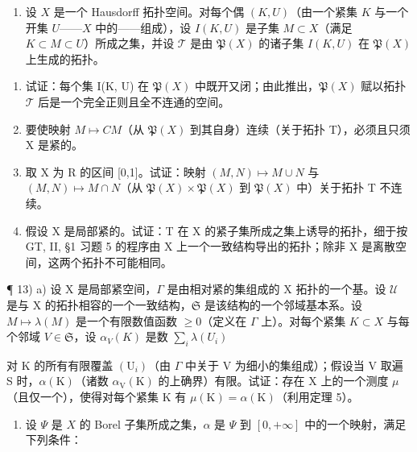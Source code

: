 \begin{enumerate}
\def\labelenumi{\arabic{enumi})}
\setcounter{enumi}{11}
\tightlist
\item
  设 \(X\) 是一个 Hausdorff 拓扑空间。对每个偶 \((K, U)\)（由一个紧集 \(K\) 与一个开集 \(U\)——\(X\) 中的——组成），设 \(I(K, U)\) 是子集 \(M \subset X\)（满足 \(K \subset M \subset U\)）所成之集，并设 \(\mathcal{T}\) 是由 \(\mathfrak{P}(X)\) 的诸子集 \(I(K, U)\) 在 \(\mathfrak{P}(X)\) 上生成的拓扑。
\end{enumerate}

\begin{enumerate}
\def\labelenumi{\alph{enumi})}
\item
  试证：每个集 I(K, U) 在 \(\mathfrak{P}(X)\) 中既开又闭；由此推出，\(\mathfrak{P}(X)\) 赋以拓扑 \(\mathcal{T}\) 后是一个完全正则且全不连通的空间。
\item
  要使映射 \(M \mapsto CM\)（从 \(\mathfrak{P}(X)\) 到其自身）连续（关于拓扑 T），必须且只须 X 是紧的。
\item
  取 X 为 R 的区间 {[}0,1{]}。试证：映射 \((M,N)\mapsto M\cup N\) 与 \((M,N)\mapsto M\cap N\)（从 \(\mathfrak{P}(X)\times\mathfrak{P}(X)\) 到 \(\mathfrak{P}(X)\) 中）关于拓扑 T 不连续。
\item
  假设 X 是局部紧的。试证：T 在 X 的紧子集所成之集上诱导的拓扑，细于按 GT, II, §1 习题 5 的程序由 X 上一个一致结构导出的拓扑；除非 X 是离散空间，这两个拓扑不可能相同。
\end{enumerate}

¶ 13) a) 设 X 是局部紧空间，\(\Gamma\) 是由相对紧的集组成的 X 拓扑的一个基。设 \(\mathcal{U}\) 是与 X 的拓扑相容的一个一致结构，\(\mathfrak{S}\) 是该结构的一个邻域基本系。设 \(M \mapsto \lambda(M)\) 是一个有限数值函数 \(\geqslant 0\)（定义在 \(\Gamma\) 上）。对每个紧集 \(K \subset X\) 与每个邻域 \(V \in \mathfrak{S}\)，设 \(\alpha_V(K)\) 是数 \(\sum_{i} \lambda(U_i)\)

对 K 的所有有限覆盖 \((\mathrm{U}_{i})\)（由 \(\Gamma\) 中关于 V 为细小的集组成）；假设当 V 取遍 S 时，\(\alpha(\mathrm{K})\)（诸数 \(\alpha_{\mathrm{V}}(\mathrm{K})\) 的上确界）有限。试证：存在 X 上的一个测度 \(\mu\)（且仅一个），使得对每个紧集 K 有 \(\mu(\mathrm{K}) = \alpha(\mathrm{K})\)（利用定理 5）。

\begin{enumerate}
\def\labelenumi{\alph{enumi})}
\setcounter{enumi}{1}
\tightlist
\item
  设 \(\Psi\) 是 \(X\) 的 Borel 子集所成之集，\(\alpha\) 是 \(\Psi\) 到 \([0, +\infty]\) 中的一个映射，满足下列条件：
\end{enumerate}

